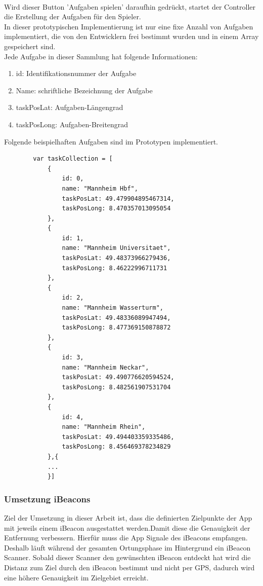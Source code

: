 \\
Wird dieser Button 'Aufgaben spielen' daraufhin gedrückt, startet der Controller die Erstellung der Aufgaben für den Spieler.
\\
In dieser prototypischen Implementierung ist nur eine fixe Anzahl von Aufgaben implementiert, die von den Entwicklern frei bestimmt wurden und in einem Array gespeichert sind.
\\
Jede Aufgabe in dieser Sammlung hat folgende Informationen:
\begin{enumerate}
\item id: Identifikationsnummer der Aufgabe
\item Name: schriftliche Bezeichnung der Aufgabe
\item taskPosLat: Aufgaben-Längengrad
\item taskPosLong: Aufgaben-Breitengrad
\end{enumerate}

Folgende beispielhaften Aufgaben sind im Prototypen implementiert.
\begin{lstlisting}
        var taskCollection = [
            {
                id: 0,
                name: "Mannheim Hbf",
                taskPosLat: 49.479904895467314,
                taskPosLong: 8.470357013095054
            },
            {
                id: 1,
                name: "Mannheim Universitaet",
                taskPosLat: 49.48373966279436,
                taskPosLong: 8.46222996711731
            },
            {
                id: 2,
                name: "Mannheim Wasserturm",
                taskPosLat: 49.48336089947494,
                taskPosLong: 8.477369150878872
            },
            {
                id: 3,
                name: "Mannheim Neckar",
                taskPosLat: 49.490776620594524,
                taskPosLong: 8.482561907531704
            },
            {
                id: 4,
                name: "Mannheim Rhein",
                taskPosLat: 49.494403359335486,
                taskPosLong: 8.456469378234829
            },{
            ...
            }]
\end{lstlisting}

\subsubsection{Umsetzung iBeacons}
Ziel der Umsetzung in dieser Arbeit ist, dass die definierten Zielpunkte der App mit jeweils einem iBeacon ausgestattet werden.Damit diese die Genauigkeit der Entfernung verbessern.
Hierfür muss die App Signale des iBeacons empfangen. Deshalb läuft während der gesamten Ortungsphase im Hintergrund ein iBeacon Scanner. Sobald dieser Scanner den gewünschten iBeacon entdeckt hat wird die Distanz zum Ziel durch den iBeacon bestimmt und nicht per GPS, dadurch wird eine höhere Genauigkeit im Zielgebiet erreicht.

